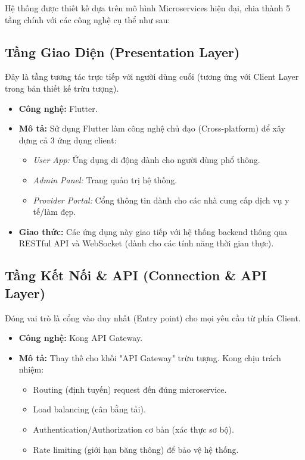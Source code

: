 Hệ thống được thiết kế dựa trên mô hình Microservices hiện đại, chia thành 5 tầng chính với các công nghệ cụ thể như sau:

\subsection*{Tầng Giao Diện (Presentation Layer)}
Đây là tầng tương tác trực tiếp với người dùng cuối (tương ứng với Client Layer trong bản thiết kế trừu tượng).

\begin{itemize}
    \item \textbf{Công nghệ:} Flutter.
    \item \textbf{Mô tả:} Sử dụng Flutter làm công nghệ chủ đạo (Cross-platform) để xây dựng cả 3 ứng dụng client:
    \begin{itemize}
        \item \textit{User App:} Ứng dụng di động dành cho người dùng phổ thông.
        \item \textit{Admin Panel:} Trang quản trị hệ thống.
        \item \textit{Provider Portal:} Cổng thông tin dành cho các nhà cung cấp dịch vụ y tế/làm đẹp.
    \end{itemize}
    \item \textbf{Giao thức:} Các ứng dụng này giao tiếp với hệ thống backend thông qua RESTful API và WebSocket (dành cho các tính năng thời gian thực).
\end{itemize}

\subsection*{Tầng Kết Nối \& API (Connection \& API Layer)}
Đóng vai trò là cổng vào duy nhất (Entry point) cho mọi yêu cầu từ phía Client.

\begin{itemize}
    \item \textbf{Công nghệ:} Kong API Gateway.
    \item \textbf{Mô tả:} Thay thế cho khối "API Gateway" trừu tượng. Kong chịu trách nhiệm:
    \begin{itemize}
        \item Routing (định tuyến) request đến đúng microservice.
        \item Load balancing (cân bằng tải).
        \item Authentication/Authorization cơ bản (xác thực sơ bộ).
        \item Rate limiting (giới hạn băng thông) để bảo vệ hệ thống.
    \end{itemize}
\end{itemize}


